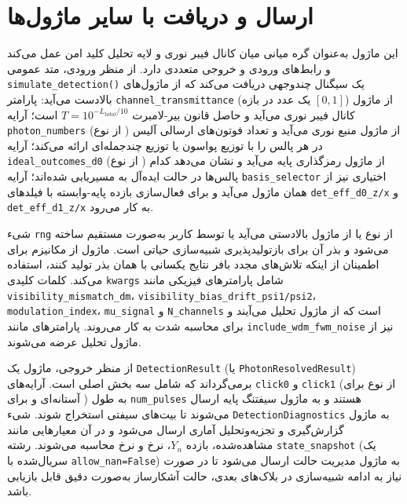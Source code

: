 \section{ارسال و دریافت با سایر ماژول‌ها}

این ماژول به‌عنوان گره میانی میان کانال فیبر نوری و لایه تحلیل کلید امن عمل می‌کند و رابط‌های ورودی و خروجی متعددی دارد. از منظر ورودی، متد عمومی \texttt{simulate\_detection()} یک سیگنال چندوجهی دریافت می‌کند که از ماژول‌های بالا‌دست می‌آید: پارامتر \texttt{channel\_transmittance} (یک عدد  در بازه $[0, 1]$) از ماژول کانال فیبر نوری  می‌آید و حاصل قانون بیر-لامبرت $T = 10^{-L_{total}/10}$ است؛ آرایه \texttt{photon\_numbers} (از نوع ) از ماژول منبع نوری  می‌آید و تعداد فوتون‌های ارسالی آلیس در هر پالس را با توزیع پواسون یا توزیع چندجمله‌ای  ارائه می‌کند؛ آرایه \texttt{ideal\_outcomes\_d0} (از نوع ) از ماژول رمزگذاری پایه  می‌آید و نشان می‌دهد کدام پالس‌ها در حالت ایده‌آل به  مسیریابی شده‌اند؛ آرایه \texttt{basis\_selector} اختیاری نیز از همان ماژول می‌آید و برای فعال‌سازی بازده پایه-وابسته  با فیلدهای \texttt{det\_eff\_d0\_z/x} و \texttt{det\_eff\_d1\_z/x} به کار می‌رود.

شیء \texttt{rng} از نوع  یا از ماژول بالادستی  می‌آید یا توسط کاربر به‌صورت مستقیم ساخته می‌شود و بذر آن برای بازتولیدپذیری شبیه‌سازی حیاتی است. ماژول از مکانیزم  برای اطمینان از اینکه تلاش‌های مجدد بافر  نتایج یکسانی با همان بذر تولید کنند، استفاده می‌کند. کلمات کلیدی \texttt{kwargs} شامل پارامترهای فیزیکی  مانند \texttt{visibility\_mismatch\_dm}، \texttt{visibility\_bias\_drift\_psi1/psi2}، \texttt{modulation\_index}، \texttt{mu\_signal} و \texttt{N\_channels} است که از ماژول تحلیل   می‌آیند و برای محاسبه شدت  به کار می‌روند. پارامترهای  مانند \texttt{include\_wdm\_fwm\_noise} نیز از ماژول تحلیل  عرضه می‌شوند.

از منظر خروجی، ماژول یک \texttt{DetectionResult} (یا \texttt{PhotonResolvedResult}) برمی‌گرداند که شامل سه بخش اصلی است. آرایه‌های \texttt{click0} و \texttt{click1} (از نوع  برای آستانه‌ای و  برای ) به طول \texttt{num\_pulses} هستند و به ماژول سيفتنگ پایه  ارسال می‌شوند تا بیت‌های سيفتی استخراج شوند. شیء \texttt{DetectionDiagnostics} به ماژول گزارش‌گیری و تجزیه‌وتحلیل آماری  ارسال می‌شود و در آن معیارهایی مانند  مشاهده‌شده، بازده  $Y_n$، نرخ  و نرخ  محاسبه می‌شوند. رشته \texttt{state\_snapshot} (یک  سریال‌شده با \texttt{allow\_nan=False}) به ماژول مدیریت حالت  ارسال می‌شود تا در صورت نیاز به ادامه شبیه‌سازی در بلاک‌های بعدی، حالت آشکارساز به‌صورت دقیق قابل بازیابی باشد.

